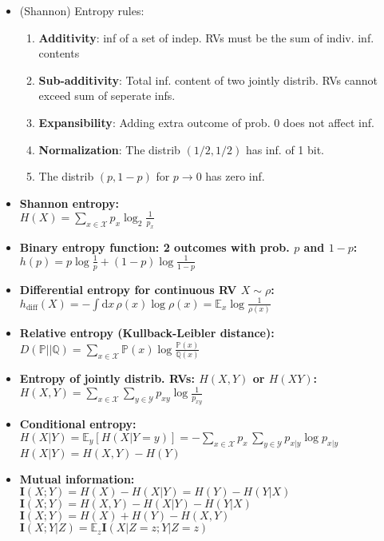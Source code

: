 \documentclass[twocolumn,9pt]{extarticle}
\begin{document}
\begin{itemize}
	\item (Shannon) Entropy rules:
		\begin{enumerate}
			\item \textbf{Additivity}: inf of a set of indep. RVs must be the sum of indiv. inf. contents 
			\item \textbf{Sub-additivity}: Total inf. content of two jointly distrib. RVs cannot exceed sum of seperate infs.
			\item \textbf{Expansibility}: Adding extra outcome of prob. 0 does not affect inf.
			\item \textbf{Normalization}: The distrib $(1/2,1/2)$ has inf. of 1 bit.
			\item The distrib $(p, 1-p)$ for $p \to 0$ has zero inf.
		\end{enumerate}

	\item \textbf{Shannon entropy:} \\
	$H(X) = \sum_{x \in \mathcal{X}} p_x \log_2 \frac{1}{p_x}$

	\item \textbf{Binary entropy function: 2 outcomes with prob. $p$ and $1-p$: } \\
	$h(p) = p \log \frac{1}{p} + (1 - p) \log \frac{1}{1-p}$

	\item \textbf{Differential entropy for continuous RV $X \sim \rho$:} \\
	$h_{\text{diff}}(X) = - \int \mathrm{d}x\, \rho(x) \log \rho(x) = \mathbb{E}_x \log \frac{1}{\rho(x)}$

	\item \textbf{Relative entropy (Kullback-Leibler distance): } \\
	$D(\mathbb{P}||\mathbb{Q}) = \sum_{x \in \mathcal{X}} \mathbb{P}(x) \log \frac{\mathbb{P}(x)}{\mathbb{Q}(x)}$

	\item \textbf{Entropy of jointly distrib. RVs: $H(X,Y)$ or $H(XY)$: } \\
	$H(X,Y) = \sum_{x \in \mathcal{X}} \sum_{y \in \mathcal{Y}} p_{xy} \log \frac{1}{p_{xy}}$

	\item \textbf{Conditional entropy: } \\
	$H(X|Y) = \mathbb{E}_y[H(X|Y = y)] = - \sum_{x \in \mathcal{X}} p_x\, \sum_{y \in \mathcal{Y}} p_{x|y} \log p_{x|y}$ \\
	$H(X|Y) = H(X,Y) - H(Y)$
	
	\item \textbf{Mutual information: } \\
	$\mathbf{I}(X;Y) = H(X) - H(X|Y) = H(Y) - H(Y|X)$\\
	$\mathbf{I}(X;Y) = H(X,Y) - H(X|Y) - H(Y|X)$\\
	$\mathbf{I}(X;Y) = H(X) + H(Y) - H(X,Y)$\\
	$\mathbf{I}(X;Y|Z) = \mathbb{E}_z \mathbf{I}(X|Z=z ; Y|Z = z)$


\end{itemize}
\end{document}
